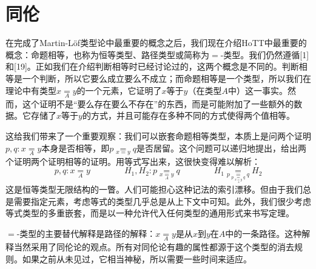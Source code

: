 \documentclass{ctexrep}
\theoremstyle{plain}
\theoremstyle{definition}
\theoremstyle{remark}
\theoremstyle{definition}
\theoremstyle{definition}
\theoremstyle{definition}
\begin{document}
\section{同伦}

在完成了Martin-Löf类型论中最重要的概念之后，我们现在介绍HoTT中最重要的概念：命题相等，也称为恒等类型、路径类型或简称为$=$-类型。我们仍然遵循[1]和[19]。正如我们在介绍判断相等时已经讨论过的，这两个概念是不同的。判断相等是一个判断，所以它要么成立要么不成立；而命题相等是一个类型，所以我们在理论中有类型$x \underset{A}{=} y$的一个元素，它证明了$x$等于$y$（在类型$A$中）这一事实。然而，这个证明不是“要么存在要么不存在”的东西，而是可能附加了一些额外的数据。它存储了$x$等于$y$的方式，并且可能存在多种不同的方式使得两个值相等。

这给我们带来了一个重要观察：我们可以嵌套命题相等类型，本质上是问两个证明$p,q:x\underset{A}{=} y$本身是否相等，即$p \underset{x=y}{=} q$是否居留。这个问题可以递归地提出，给出两个证明两个证明相等的证明。用等式写出来，这很快变得难以解析：
\[
p, q : x \underset{A}{=} y \qquad\qquad H_1, H_2 : p \underset{x \underset{A}{=} y}{=} q \qquad\qquad H_1 \underset{p \underset{p \underset{x \underset{A}{=} y}{=} q}{=} q}{=} H_2
\]
这是恒等类型无限结构的一瞥。人们可能担心这种记法的索引漂移。但由于我们总是需要指定元素，考虑等式的类型几乎总是从上下文中可知。此外，我们很少考虑等式类型的多重嵌套，而是以一种允许代入任何类型的通用形式来书写定理。

$=$-类型的主要替代解释是路径的解释：$x \underset{A}{=} y$是从$x$到$y$在$A$中的一条路径。这种解释当然采用了同伦论的观点。所有对同伦论有趣的属性都源于这个类型的消去规则。如果之前从未见过，它相当神秘，所以需要一些时间来适应。
\end{document}
